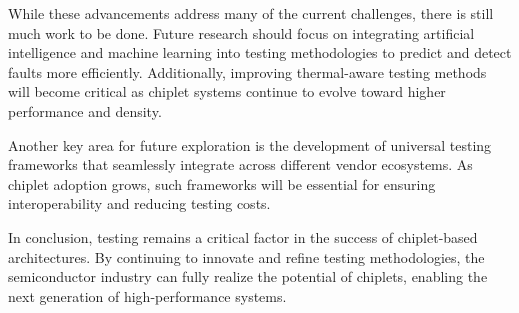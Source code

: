 \documentclass[acmtog, 12pt]{acmart}
\begin{document}
While these advancements address many of the current challenges, there is still much work to be done. Future research should focus on integrating artificial intelligence and machine learning into testing methodologies to predict and detect faults more efficiently. Additionally, improving thermal-aware testing methods will become critical as chiplet systems continue to evolve toward higher performance and density.

Another key area for future exploration is the development of universal testing frameworks that seamlessly integrate across different vendor ecosystems. As chiplet adoption grows, such frameworks will be essential for ensuring interoperability and reducing testing costs.

In conclusion, testing remains a critical factor in the success of chiplet-based architectures. By continuing to innovate and refine testing methodologies, the semiconductor industry can fully realize the potential of chiplets, enabling the next generation of high-performance systems.





\end{document}
